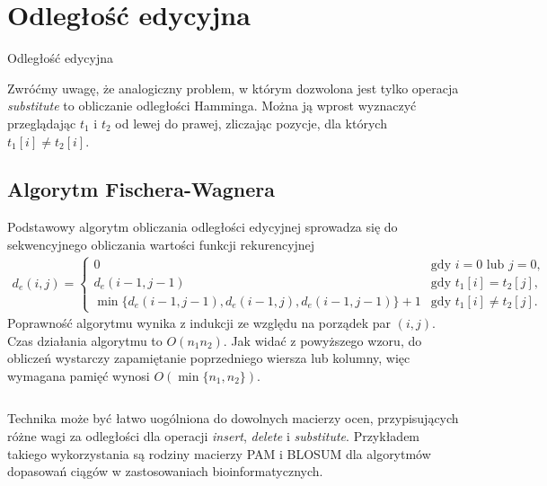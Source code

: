 \section{Odległość edycyjna}

\begin{algorithm}[H]
    \caption{Odległość edycyjna}
\end{algorithm}

Zwróćmy uwagę, że analogiczny problem, w którym dozwolona jest tylko operacja \emph{substitute} to obliczanie odległości Hamminga. Można ją wprost wyznaczyć przeglądając $t_1$ i $t_2$ od lewej do prawej, zliczając pozycje, dla których $t_1[i] \neq t_2[i]$.

\subsection{Algorytm Fischera-Wagnera}

Podstawowy algorytm obliczania odległości edycyjnej sprowadza się do sekwencyjnego obliczania wartości funkcji rekurencyjnej
\begin{align*}
  d_e(i, j) =
  \begin{cases}
    0 & \text{gdy $i = 0$ lub $j = 0$,} \\
    d_e(i - 1, j - 1) & \text{gdy $t_1[i] = t_2[j]$,} \\
    \min\{d_e(i - 1, j - 1), d_e(i - 1, j), d_e(i - 1, j - 1)\} + 1 & \text{gdy $t_1[i] \neq t_2[j]$.}
  \end{cases}
\end{align*}
Poprawność algorytmu wynika z indukcji ze względu na porządek par $(i, j)$. Czas działania algorytmu to $O(n_1 n_2)$.
Jak widać z powyższego wzoru, do obliczeń wystarczy zapamiętanie poprzedniego wiersza lub kolumny, więc wymagana pamięć wynosi $O(\min\{n_1, n_2\})$.

\begin{code}
\inputminted{python}{code/other/edit-distance.py}
\label{alg:edit-distance}
\end{code}

Technika może być łatwo uogólniona do dowolnych macierzy ocen, przypisujących różne wagi za odległości dla operacji \emph{insert}, \emph{delete} i \emph{substitute}. Przykładem takiego wykorzystania są rodziny macierzy PAM i BLOSUM dla algorytmów dopasowań ciągów w zastosowaniach bioinformatycznych.

